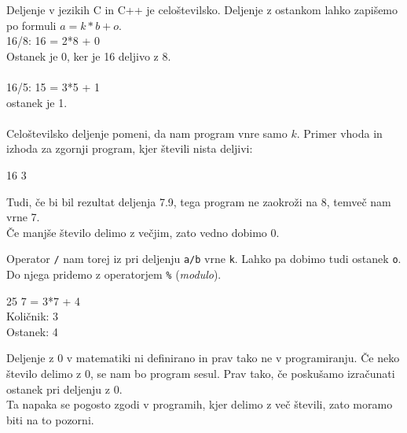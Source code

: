 \documentclass{book}
\begin{document}
\begin{errors}
Deljenje v jezikih C in C++ je celoštevilsko. Deljenje z ostankom lahko zapišemo
po formuli $a = k*b + o$.\\

16/8: 16 = 2*8 + 0 \\
Ostanek je 0, ker je 16 deljivo z 8. \\\\

16/5: 15 = 3*5 + 1 \\
ostanek je 1. \\\\

Celoštevilsko deljenje pomeni, da nam program vnre samo $k$. Primer vhoda in
izhoda za zgornji program, kjer števili nista deljivi:

\begin{inout}
16 3
\end{inout}

Tudi, če bi bil rezultat deljenja 7.9, tega program ne zaokroži na 8, temveč nam vrne 7. \\
Če manjše število delimo z večjim, zato vedno dobimo 0.

\end{errors}

\newpage
Operator \verb+/+ nam torej iz pri deljenju \verb+a/b+ vrne \verb+k+. Lahko pa
dobimo tudi ostanek \verb+o+. Do njega pridemo z operatorjem \verb+%+
(\emph{modulo}).

\begin{examples}


\begin{inout}
25 7
 = 3*7 + 4 \\
Količnik: 3 \\
Ostanek: 4
\end{inout}

\end{examples}

\begin{errors}
Deljenje z 0 v matematiki ni definirano in prav tako ne v programiranju. Če neko
število delimo z 0, se nam bo program sesul. Prav tako, če poskušamo izračunati
ostanek pri deljenju z 0. \\
Ta napaka se pogosto zgodi v programih, kjer delimo z več števili, zato moramo
biti na to pozorni.
\end{errors}
\end{document}
